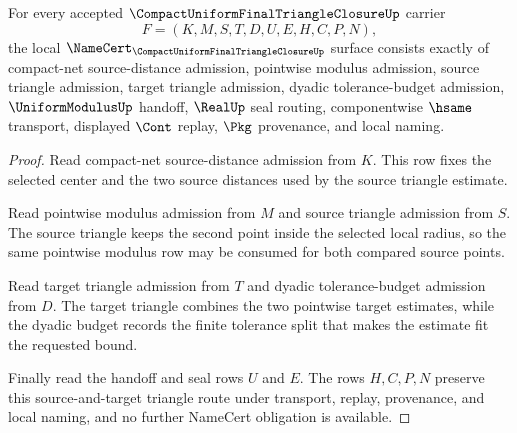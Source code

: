 \begin{theorem}
\label{thm:compact-uniform-final-triangle-closure-namecert-obligations}
For every accepted $\CompactUniformFinalTriangleClosureUp$ carrier
$$
F=(K,M,S,T,D,U,E,H,C,P,N),
$$
the local $\NameCert_{\CompactUniformFinalTriangleClosureUp}$ surface consists exactly of compact-net source-distance admission, pointwise modulus admission, source triangle admission, target triangle admission, dyadic tolerance-budget admission, $\UniformModulusUp$ handoff, $\RealUp$ seal routing, componentwise $\hsame$ transport, displayed $\Cont$ replay, $\Pkg$ provenance, and local naming.
\end{theorem}
\begin{proof}
Read compact-net source-distance admission from $K$. This row fixes the selected center and the two source distances used by the source triangle estimate.

Read pointwise modulus admission from $M$ and source triangle admission from $S$. The source triangle keeps the second point inside the selected local radius, so the same pointwise modulus row may be consumed for both compared source points.

Read target triangle admission from $T$ and dyadic tolerance-budget admission from $D$. The target triangle combines the two pointwise target estimates, while the dyadic budget records the finite tolerance split that makes the estimate fit the requested bound.

Finally read the handoff and seal rows $U$ and $E$. The rows $H,C,P,N$ preserve this source-and-target triangle route under transport, replay, provenance, and local naming, and no further NameCert obligation is available.
\end{proof}

